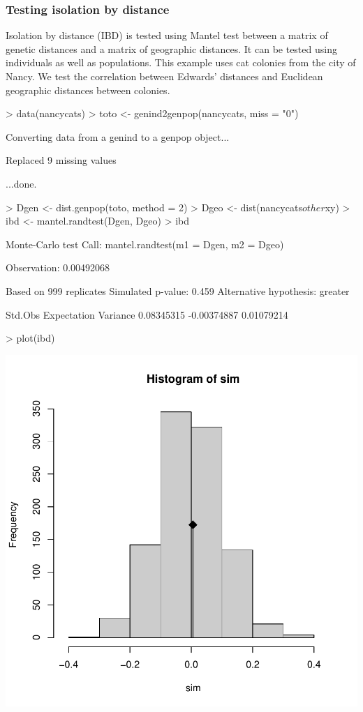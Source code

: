 \documentclass{article}
\begin{document}
\subsubsection{Testing isolation by distance}
Isolation by distance (IBD) is tested using Mantel test between a matrix of genetic distances and a matrix of geographic distances.
It can be tested using individuals as well as populations.
This example uses cat colonies from the city of Nancy.
We test the correlation between Edwards' distances and Euclidean geographic distances between colonies.
\begin{Schunk}
\begin{Sinput}
> data(nancycats)
> toto <- genind2genpop(nancycats, miss = "0")
\end{Sinput}
\begin{Soutput}
 Converting data from a genind to a genpop object... 

 Replaced 9 missing values 

...done.
\end{Soutput}
\begin{Sinput}
> Dgen <- dist.genpop(toto, method = 2)
> Dgeo <- dist(nancycats$other$xy)
> ibd <- mantel.randtest(Dgen, Dgeo)
> ibd
\end{Sinput}
\begin{Soutput}
Monte-Carlo test
Call: mantel.randtest(m1 = Dgen, m2 = Dgeo)

Observation: 0.00492068 

Based on 999 replicates
Simulated p-value: 0.459 
Alternative hypothesis: greater 

    Std.Obs Expectation    Variance 
 0.08345315 -0.00374887  0.01079214 
\end{Soutput}
\end{Schunk}
\begin{Schunk}
\begin{Sinput}
> plot(ibd)
\end{Sinput}
\end{Schunk}
\includegraphics{figs/base-080}
\end{document}
